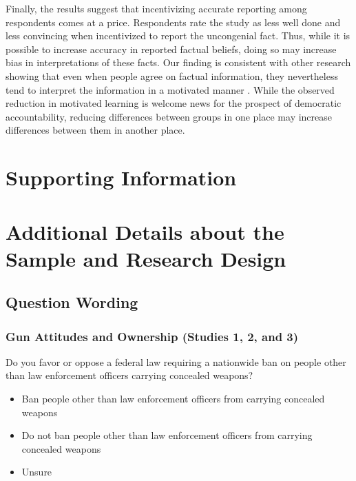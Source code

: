 \documentclass[12pt, letterpaper]{article}
\begin{document}
Finally, the results suggest that incentivizing accurate reporting among respondents comes at a price. Respondents rate the study as less well done and less convincing when incentivized to report the uncongenial fact. Thus, while it is possible to increase accuracy in reported factual beliefs, doing so may increase bias in interpretations of these facts. Our finding is consistent with other research showing that even when people agree on factual information, they nevertheless tend to interpret the information in a motivated manner \citep[e.g.,][]{gaines2007, bisgaard2015}. While the observed reduction in motivated learning is welcome news for the prospect of democratic accountability, reducing differences between groups in one place may increase differences between them in another place.

\clearpage

  
\clearpage

\section*{Supporting Information}
\setcounter{section}{0}
\renewcommand\thetable{SI \arabic{table}}
\renewcommand\thefigure{SI \arabic{figure}}
\setcounter{table}{0}
\setcounter{figure}{0}

\section{Additional Details about the Sample and Research Design}

\subsection{Question Wording}
\label{sec:qwording}
\singlespacing
\setlength{\parindent}{0cm} 

\subsubsection{Gun Attitudes and Ownership (Studies 1, 2, and 3)}
Do you favor or oppose a federal law requiring a nationwide ban on people other than law enforcement officers carrying concealed weapons?
\vspace{-3mm}
\begin{itemize}
\setlength\itemsep{-.5em}
  \item Ban people other than law enforcement officers from carrying concealed weapons
  \item Do not ban people other than law enforcement officers from carrying concealed weapons
  \item Unsure
\end{itemize}
\end{document}

